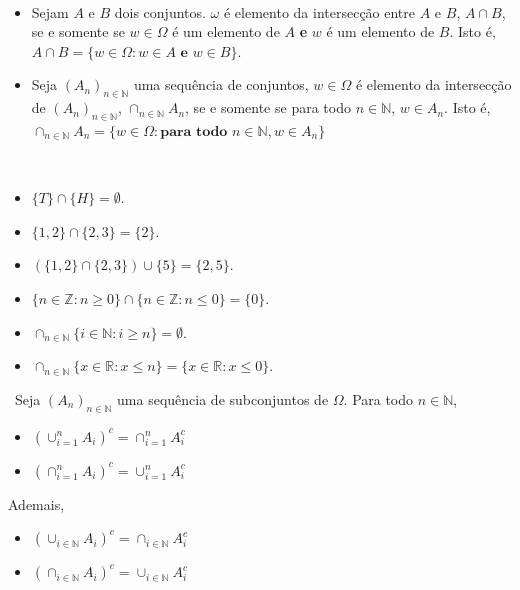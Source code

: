   
  \begin{definition} \
    \label{intersection}
    \begin{itemize}
      \item Sejam $A$ e $B$ dois conjuntos. $\omega$ é elemento da intersecção entre $A$ e $B$, $A \cap B$, 
			se e somente se $w \in \Omega$ é um elemento de $A$ \textbf{e} $w$ é um elemento de $B$. 
			Isto é, $A \cap B = \{w \in \Omega: w \in A \textbf{ e } w \in B\}$.
      \item Seja $(A_{n})_{n \in \mathbb{N}}$ uma sequência de conjuntos, 
			$w \in \Omega$ é elemento da intersecção de $(A_{n})_{n \in \mathbb{N}}$, 
			$\cap_{n \in \mathbb{N}}{A_{n}}$, se e somente se para todo $n \in \mathbb{N}$, $w \in A_{n}$. 
			Isto é, $\cap_{n \in \mathbb{N}}{A_{n}} = \{w \in \Omega: \textbf{para todo } n \in \mathbb{N}, w \in A_{n}\}$
    \end{itemize}
  \end{definition}
    
  \begin{example}[$\cap$] \
    \begin{itemize}
      \item $\{T\} \cap \{H\} = \emptyset$.
      \item $\{1,2\} \cap \{2,3\} = \{2\}$.
      \item $(\{1,2\} \cap \{2,3\}) \cup \{5\} = \{2,5\}$.
      \item $\{n \in \mathbb{Z}: n \geq 0\} \cap \{n \in \mathbb{Z}: n \leq 0\} = \{0\}$.
      \item $\cap_{n \in \mathbb{N}}{\{i \in \mathbb{N}: i \geq n\}} = \emptyset$.
      \item $\cap_{n \in \mathbb{N}}{\{x \in \mathbb{R}: x \leq n\}} = \{x \in \mathbb{R}: x \leq 0\}$.
    \end{itemize}
  \end{example}


\begin{theorem}\ 
Seja $(A_n)_{n \in \mathbb{N}}$ uma sequência de subconjuntos de $\Omega$. 
Para todo $n \in \mathbb{N}$,
\begin{itemize}
\item $\left(\cup_{i=1}^n A_i \right)^c = \cap_{i=1}^n A^c_i$
\item $\left(\cap_{i=1}^n A_i \right)^c = \cup_{i=1}^n A^c_i$
\end{itemize}
Ademais,
\begin{itemize}
\item $\left(\cup_{i\in \mathbb{N}} A_i \right)^c = \cap_{i\in \mathbb{N}} A^c_i$
\item $\left(\cap_{i\in \mathbb{N}} A_i \right)^c = \cup_{i\in \mathbb{N}} A^c_i$
\end{itemize}
\end{theorem}

